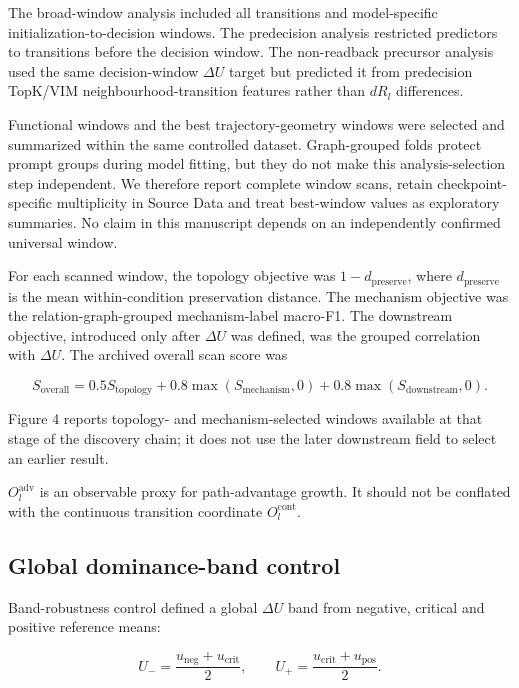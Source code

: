 \documentclass[11pt]{article}
\begin{document}
The broad-window analysis included all transitions and model-specific initialization-to-decision windows. The predecision analysis restricted predictors to transitions before the decision window. The non-readback precursor analysis used the same decision-window \(\Delta U\) target but predicted it from predecision TopK/VIM neighbourhood-transition features rather than \(dR_l\) differences.

Functional windows and the best trajectory-geometry windows were selected and summarized within the same controlled dataset. Graph-grouped folds protect prompt groups during model fitting, but they do not make this analysis-selection step independent. We therefore report complete window scans, retain checkpoint-specific multiplicity in Source Data and treat best-window values as exploratory summaries. No claim in this manuscript depends on an independently confirmed universal window.

For each scanned window, the topology objective was \(1-d_{\mathrm{preserve}}\), where \(d_{\mathrm{preserve}}\) is the mean within-condition preservation distance. The mechanism objective was the relation-graph-grouped mechanism-label macro-F1. The downstream objective, introduced only after \(\Delta U\) was defined, was the grouped correlation with \(\Delta U\). The archived overall scan score was

\begin{equation*}
S_{\mathrm{overall}}=0.5S_{\mathrm{topology}}+0.8\max(S_{\mathrm{mechanism}},0)+0.8\max(S_{\mathrm{downstream}},0).
\end{equation*}

Figure 4 reports topology- and mechanism-selected windows available at that stage of the discovery chain; it does not use the later downstream field to select an earlier result.

\(O_l^{\mathrm{adv}}\) is an observable proxy for path-advantage growth. It should not be conflated with the continuous transition coordinate \(O_l^{\mathrm{cont}}\).

\subsection*{Global dominance-band control}
Band-robustness control defined a global \(\Delta U\) band from negative, critical and positive reference means:

\begin{equation*}
U_{-}=\frac{u_{\mathrm{neg}}+u_{\mathrm{crit}}}{2},\qquad
U_{+}=\frac{u_{\mathrm{crit}}+u_{\mathrm{pos}}}{2}.
\end{equation*}
\end{document}
